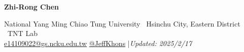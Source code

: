 \documentclass{OpenCV}
\newlength{\hvspace}
\begin{document}
\begin{center}
    \noindent\textbf{\LARGE Zhi-Rong Chen} \\
\end{center}
\vspace{\hvspace}
\hrulefill
\vspace{\hvspace}
\begin{center}
    \noindent National Yang Ming Chiao Tung University \textbullet\ Hsinchu City, Eastern District \textbullet\ TNT Lab \\
    \noindent\faEnvelopeO\enskip \href{mailto:e14109022@gs.ncku.edu.tw}{e14109022@gs.ncku.edu.tw}\enskip
    \faGithub\enskip\href{https://github.com/JeffKhons}{@JeffKhons}\enskip
    |\enskip \textit{Updated: 2025/2/17} \\
\end{center}
\vspace{\hvspace}
\vspace{-4pt}
\hrulefill
\vspace{-12pt}









\end{document}
